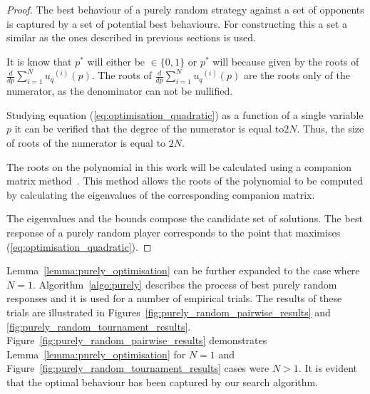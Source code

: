 \documentclass[10pt]{article}
\begin{document}
\begin{proof}
    The best behaviour of a purely random strategy against a set of opponents is
    captured by a set of potential best behaviours. For constructing this a set
    a similar as the ones described in previous sections is used.

    It is know that \(p ^ *\) will either be \(\in \{0, 1\}\) or \(p ^ *\) will because
    given by the roots of \(\frac{d}{dp} \sum\limits_{i=1} ^ {N} {u_q}^{(i)}(p)\).
    The roots of  \(\frac{d}{dp} \sum\limits_{i=1} ^ {N} {u_q}^{(i)} (p)\) are the roots
    only of the numerator, as the denominator can not be nullified.

    Studying equation (\ref{eq:optimisation_quadratic}) as a function of a single variable
    \(p\) it can be verified that the degree of the numerator is equal to\(2N\).
    Thus, the size of roots of the numerator is equal to \(2N\).

    The roots on the polynomial in this work will be calculated using a companion
    matrix method~\cite{Edelman1995}. This method allows the roots of the polynomial to
    be computed by calculating the eigenvalues of the corresponding companion
    matrix.

    The eigenvalues and the bounds compose the candidate set of solutions. The
    best response of a purely random player corresponds to the point that maximises
    (\ref{eq:optimisation_quadratic}).
\end{proof}

Lemma~\ref{lemma:purely_optimisation} can be further expanded to the case where \(N=1\).
Algorithm~\ref{algo:purely} describes the process of best purely random responses and it is
used for a number of empirical trials.
The results of these trials are illustrated in Figures~\ref{fig:purely_random_pairwise_results}
and \ref{fig:purely_random_tournament_results}. Figure~\ref{fig:purely_random_pairwise_results}
demonstrates Lemma~\ref{lemma:purely_optimisation} for \(N=1\) and
Figure~\ref{fig:purely_random_tournament_results} cases were \(N>1\).
It is evident that the optimal behaviour has been captured by our search algorithm.
\end{document}
